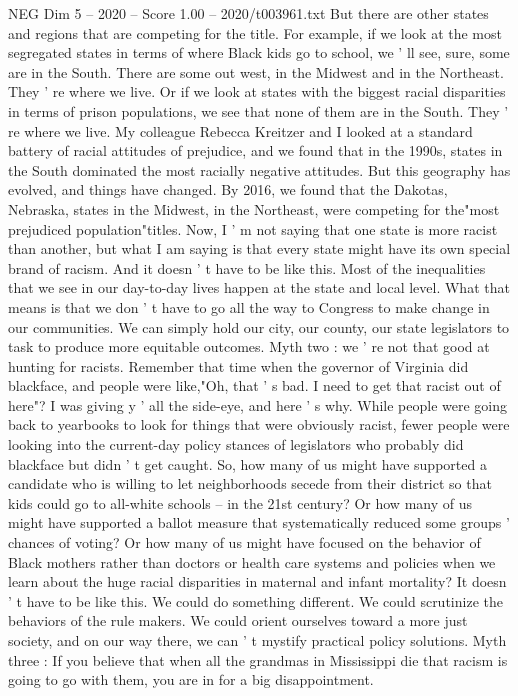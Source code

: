 \begin{textsample}{NEG Dim 5 – 2020 – Score 1.00 – 2020/t003961.txt}
But there are other states and regions that are competing for the title.
For example, if we look at the most segregated states in terms of where Black kids go to school, we ' ll see, sure, some are in the South.
There are some out west, in the Midwest and in the Northeast.
They ' re where we live.
Or if we look at states with the biggest racial disparities in terms of prison populations, we see that none of them are in the South.
They ' re where we live.
My colleague Rebecca Kreitzer and I looked at a standard battery of racial attitudes of prejudice, and we found that in the 1990s, states in the South dominated the most racially negative attitudes.
But this geography has evolved, and things have changed.
By 2016, we found that the Dakotas, Nebraska, states in the Midwest, in the Northeast, were competing for the"most prejudiced population"titles.
Now, I ' m not saying that one state is more racist than another, but what I am saying is that every state might have its own special brand of racism.
And it doesn ' t have to be like this.
Most of the inequalities that we see in our day-to-day lives happen at the state and local level.
What that means is that we don ' t have to go all the way to Congress to make change in our communities.
We can simply hold our city, our county, our state legislators to task to produce more equitable outcomes.
Myth two : we ' re not that good at hunting for racists.
Remember that time when the governor of Virginia did blackface, and people were like,"Oh, that ' s bad.
I need to get that racist out of here"?
I was giving y ' all the side-eye, and here ' s why.
While people were going back to yearbooks to look for things that were obviously racist, fewer people were looking into the current-day policy stances of legislators who probably did blackface but didn ' t get caught.
So, how many of us might have supported a candidate who is willing to let neighborhoods secede from their district so that kids could go to all-white schools -- in the 21st century?
Or how many of us might have supported a ballot measure that systematically reduced some groups ' chances of voting?
Or how many of us might have focused on the behavior of Black mothers rather than doctors or health care systems and policies when we learn about the huge racial disparities in maternal and infant mortality?
It doesn ' t have to be like this.
We could do something different.
We could scrutinize the behaviors of the rule makers.
We could orient ourselves toward a more just society, and on our way there, we can ' t mystify practical policy solutions.
Myth three : If you believe that when all the grandmas in Mississippi die that racism is going to go with them, you are in for a big disappointment.

\end{textsample}
